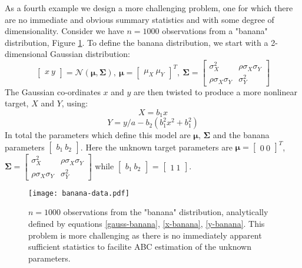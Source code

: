 As a fourth example we design a more challenging problem, one for which there are no immediate and obvious summary statistics and with some degree of dimensionality. Consider we have $n = 1000$ observations from a "banana" distribution, Figure \ref{banana-data}. To define the banana distribution, we start with a 2-dimensional Gaussian distribution:
\begin{equation}
\begin{bmatrix}
x\ y
\end{bmatrix}=\mathcal{N}(\bm{\mu},\bm{\Sigma}),\ \bm{\mu} = \begin{bmatrix}
\mu_X\ \mu_Y
\end{bmatrix}^T,\ \bm{\Sigma} = \begin{bmatrix}
\sigma^2_X & \rho\sigma_X\sigma_Y\\
\rho\sigma_X\sigma_Y & \sigma^2_Y
\end{bmatrix} 
\label{gauss-banana}
\end{equation}
The Gaussian co-ordinates $x$ and $y$ are then twisted to produce a more nonlinear target, $X$ and $Y$, using:
\begin{equation}
X = b_1x
\label{x-banana}
\end{equation}
\begin{equation}
Y = y/a-b_2(b_1^2x^2+b_1^2)
\label{y-banana}
\end{equation}
In total the parameters which define this model are $\bm{\mu}$, $\bm{\Sigma}$ and the banana parameters $\begin{bmatrix}
b_1\ b_2
\end{bmatrix}$. Here the unknown target parameters are $\bm{\mu} = \begin{bmatrix}
0\ 0
\end{bmatrix}^T$,
$\bm{\Sigma} = \begin{bmatrix}
\sigma^2_X & \rho\sigma_X\sigma_Y\\
\rho\sigma_X\sigma_Y & \sigma^2_Y
\end{bmatrix}$ while $\begin{bmatrix}
b_1\ b_2
\end{bmatrix}$ = $\begin{bmatrix}
1\ 1
\end{bmatrix}$. 

\begin{figure}[H]
\centering
\texttt{[image: banana-data.pdf]}
\caption{$n = 1000$ observations from the "banana" distribution, analytically defined by equations \ref{gauss-banana}, \ref{x-banana}, \ref{y-banana}. 
This problem is more challenging as there is no immediately apparent sufficient statistics to facilite ABC estimation of the unknown parameters.}
\label{banana-data}
\end{figure}

